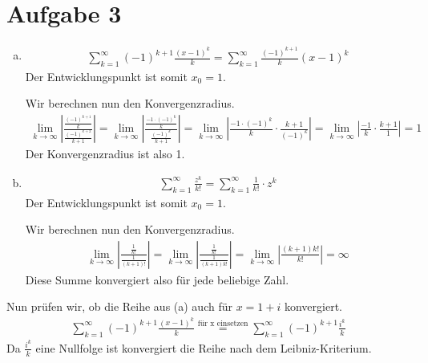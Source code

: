 \documentclass[10pt,a4paper,parskip=half]{scrartcl}
\begin{document}
\section*{Aufgabe 3}
\begin{enumerate}[a)]
\item 
\begin{align*}
\sum_{k=1}^{\infty}(-1)^{k+1}\frac{(x-1)^k}{k} = \sum_{k=1}^{\infty} \frac{(-1)^{k+1}}{k}(x-1)^k
\end{align*}
Der Entwicklungspunkt ist somit $x_0 = 1$.

Wir berechnen nun den Konvergenzradius.
\begin{align*}
\lim_{k\to\infty} \left|\frac{\frac{(-1)^{k+1}}{k}}{\frac{(-1)^{k+2}}{k+1}}\right| = \lim_{k\to\infty} \left|\frac{\frac{-1\cdot(-1)^{k}}{k}}{\frac{(-1)^{k}}{k+1}}\right| = \lim_{k\to\infty} \left|\frac{-1\cdot(-1)^{k}}{k} \cdot \frac{k+1}{(-1)^{k}}\right| = \lim_{k\to\infty} \left|\frac{-1}{k} \cdot \frac{k+1}{1}\right| = 1
\end{align*}
Der Konvergenzradius ist also 1.
\item
\begin{align*}
\sum_{k=1}^{\infty} \frac{z^k}{k!} = \sum_{k=1}^{\infty} \frac{1}{k!} \cdot z^k
\end{align*}
Der Entwicklungspunkt ist somit $x_0 = 1$.

Wir berechnen nun den Konvergenzradius.
\begin{align*}
\lim_{k\to\infty} \left|\frac{\frac 1 {k!}}{\frac 1 {(k+1)!}}\right| = \lim_{k\to\infty} \left|\frac{\frac 1 {k!}}{\frac 1 {(k+1) k!}}\right| = \lim_{k\to\infty} \left|\frac {(k+1) k!} {k!}\right| = \infty
\end{align*}
Diese Summe konvergiert also für jede beliebige Zahl.
\end{enumerate}
Nun prüfen wir, ob die Reihe aus (a) auch für $x=1+i$ konvergiert. 
\begin{align*}
\sum_{k=1}^{\infty}(-1)^{k+1}\frac{(x-1)^k}{k} \overset{\text{für x einsetzen}}{=} \sum_{k=1}^{\infty}(-1)^{k+1}\frac{i^k}{k}
\end{align*}
Da $\frac{i^k}{k}$ eine Nullfolge ist konvergiert die Reihe nach dem Leibniz-Kriterium.
\end{document}
